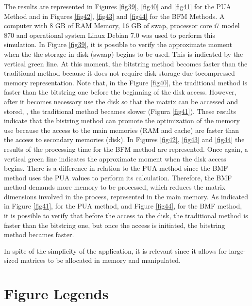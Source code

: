 \documentclass[10pt]{article}
\begin{document}
The results are represented in Figures \ref{fig39}, \ref{fig40} and \ref{fig41} 
for the PUA Method and in Figures 
\ref{fig42}, \ref{fig43} and \ref{fig44} for the 
BFM Methods.  A computer with 8 GB of RAM Memory, 16 GB of swap, processor core 
i7 model 870  
and operational 
system Linux Debian 7.0 was used to perform this simulation. In Figure 
\ref{fig39}, it is possible to verify the approximate 
moment  when the  the storage in disk (swaap) begins to be used. This is 
indicated by the vertical green line. 
At this moment, the bitstring method becomes faster than the traditional method 
because it does not require disk 
storage due tocompressed memory representation. Note that, in the Figure 
\ref{fig40}, the traditional method is faster 
than the bitstring one before the beginning of the disk access. However, after 
it becomes necessary use the disk 
so that the matrix can be accessed and stored, , the traditional method  becames 
slower (Figura \ref{fig41}). 
These results 
indicate that the bistring method can promote the optimization of the memory use 
because the access to the main 
memories (RAM and cache) are faster than the access to secondary memories 
(disk). In Figures \ref{fig42}, 
\ref{fig43} and \ref{fig44} the 
results of the processing time for  the BFM method are represented. Once again, 
a vertical green line indicates 
the approximate moment when the disk access begins. There is a difference in 
relation to the PUA method since the 
BMF method uses the PUA values to perform its calculation. Therefore, the BMF 
method demands more memory to be 
processed, which reduces the matrix dimensions involved in the process, 
represented in the main memory. As 
indicated in Figure \ref{fig41}, for the PUA method, and Figure \ref{fig44}, for 
the BMF method, it is possible 
to verify that 
before the access to the disk, the traditional method is faster than the 
bitstring one, but once the access 
is initiated,  the bitstring method becames faster.

In spite of the simplicity of the application, it is relevant since  it allows 
for large-sized matrices to be 
allocated in memory and manipulated.

\newpage

\section*{Figure Legends}
\end{document}
